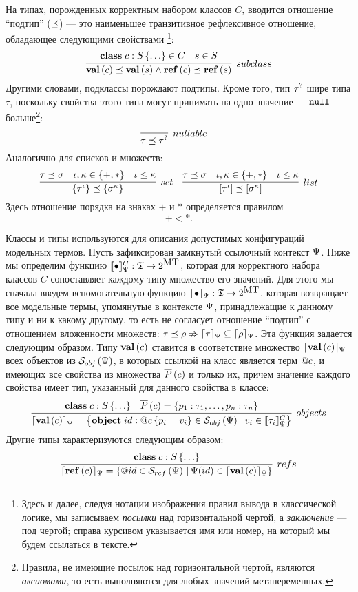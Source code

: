 На типах, порожденных корректным набором классов $C$, вводится отношение ``подтип'' ($\preceq$) --- это наименьшее транзитивное рефлексивное отношение, обладающее следующими свойствами%
\footnote{Здесь и далее, следуя нотации изображения правил вывода в классической логике, мы записываем \emph{посылки} над горизонтальной чертой, а \emph{заключение} --- под чертой; справа курсивом указывается имя или номер, на который мы будем ссылаться в тексте.}:
$$
\infer[subclass]{
\ClassT{c} \subtype \ClassT{s}
\wedge
\RefT{c} \subtype \RefT{s}
}{
	\Class{c}{S}{\ldots} \in C &
	s \in S}
$$  
Другими словами, подклассы порождают подтипы. Кроме того, тип ${\tau}^?$ шире типа $\tau$, поскольку свойства этого типа могут принимать на одно значение --- $\mathtt{null}$ --- больше\footnote{Правила, не имеющие посылок над горизонтальной чертой, являются \emph{аксиомами}, то есть выполняются для любых значений метапеременных.}:
$$
\infer[nullable]{
	\tau \subtype \NullableT{\tau}
}{}
\quad
$$
Аналогично для списков и множеств:
 $$
\infer[set]{
	\SetT{\tau^\iota} \subtype \SetT{\sigma^\kappa}
}{
	\tau \subtype \sigma &
	\iota, \kappa \in \{+, *\} &
	\iota \le \kappa
}
\quad
\infer[list]{
	\ListT{\tau^\iota} \subtype \ListT{\sigma^\kappa}
}{
	\tau \subtype \sigma &
	\iota, \kappa \in \{+, *\} &
	\iota \le \kappa
}
$$
Здесь отношение порядка на знаках $+$ и $*$ определяется правилом $$+ < *.$$

Классы и типы используются для описания допустимых конфигураций модельных термов. 
Пусть зафиксирован замкнутый ссылочный контекст $\Psi$. 
Ниже мы определим функцию $[\![\bullet]\!]_\Psi^C : \mathfrak{T} \rightarrow 2^{\mbox{MT}}$, которая для корректного набора классов $C$ сопоставляет каждому типу множество его значений. Для этого мы сначала введем вспомогательную функцию $\lceil \bullet \rceil_\Psi : \mathfrak{T} \rightarrow 2^{\mbox{MT}}$, которая возвращает все модельные термы, упомянутые в контексте $\Psi$, принадлежащие к данному типу и ни к какому другому, то есть не согласует отношение ``подтип'' с отношением вложенности множеств: $\tau \preceq \rho \nRightarrow \lceil \tau \rceil_\Psi \subseteq \lceil \rho \rceil_\Psi$. Эта функция задается следующим образом. Типу $\mathbf{val}\left(c\right)$ ставится в соответствие множество $\lceil \mathbf{val}\left(c\right) \rceil_\Psi$ всех объектов из $\mathcal{S}_{obj}\left(\Psi\right)$, в которых ссылкой на класс является терм $@c$, и имеющих все свойства из множества $\overline{P}\left(c\right)$ и только их, причем значение каждого свойства имеет тип, указанный для данного свойства в классе:
$$
\infer[objects]{
	\semRC{\ClassT{c}} = \left\{
		\Object{id}{\Ref{c}}{p_i = v_i} \in \Objects{\RContext}
		\,|\,
		v_i \in \denotRCC{\tau_i} 
	\right\}
}{
	\Class{c}{S}{\ldots}&
	\AllProps{c} = \left\{p_1 : \tau_1, \ldots, p_n : \tau_n\right\}
}
$$ 
Другие типы характеризуются следующим образом:
$$
\infer[refs]{
	\semRC{\RefT{c}} = \left\{ \Ref{id} \in \Refs{\RContext} \,|\, \RContext(id) \in \semRC{\ClassT{c}} \right\}
}{
	\Class{c}{S}{\ldots}
}
$$

